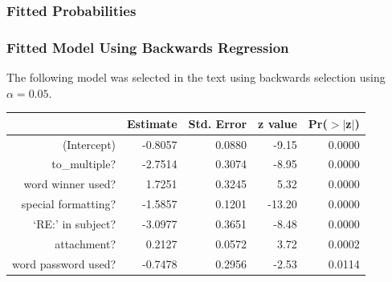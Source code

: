 \documentclass[slides]{beamer}
\begin{document}
\begin{frame}[fragile]
\frametitle{Fitted Probabilities}
%
%
\end{frame}


\begin{frame}[fragile]
\frametitle{Fitted Model Using Backwards Regression}
The following model was selected in the text using backwards selection using $\alpha=0.05$.

\begin{table}[ht]
\centering
\begin{tabular}{r|rrrr}
  \hline
 & Estimate & Std. Error & z value & Pr($>$$|$z$|$) \\ 
  \hline
(Intercept) & -0.8057 & 0.0880 & -9.15 & 0.0000 \\ 
  to\_multiple? & -2.7514 & 0.3074 & -8.95 & 0.0000 \\ 
  word winner used? & 1.7251 & 0.3245 & 5.32 & 0.0000 \\ 
  special formatting? & -1.5857 & 0.1201 & -13.20 & 0.0000 \\ 
  `RE:' in subject? & -3.0977 & 0.3651 & -8.48 & 0.0000 \\ 
  attachment? & 0.2127 & 0.0572 & 3.72 & 0.0002 \\ 
  word password used? & -0.7478 & 0.2956 & -2.53 & 0.0114 \\ 
   \hline
\end{tabular}
\end{table} 

\end{frame}
\end{document}
